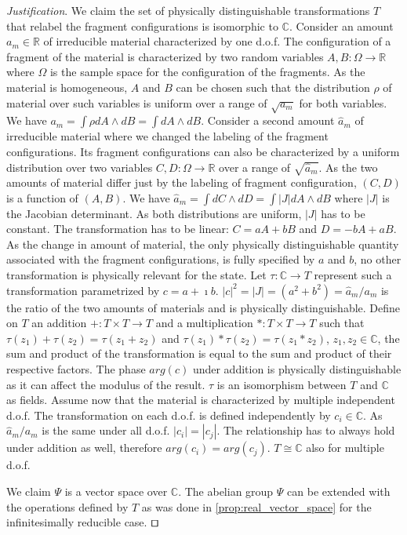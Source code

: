 \documentclass[smallextended]{svjour3}
\numberwithin{equation}{section}
\newenvironment{justification}{\emph{Justification}.}{\hfill\(\qed\)}
\theoremstyle{definition}
\newenvironment{justification}{\emph{Justification}.}{\qed}
\begin{document}
\begin{justification}
	We claim the set of physically distinguishable transformations $T$ that relabel the fragment configurations is isomorphic to $\mathbb{C}$. Consider an amount $a_m \in \mathbb{R}$ of irreducible material characterized by one d.o.f. The configuration of a fragment of the material is characterized by two random variables $A, B: \Omega \rightarrow \mathbb{R}$ where $\Omega$ is the sample space for the configuration of the fragments. As the material is homogeneous, $A$ and $B$ can be chosen such that the distribution $\rho$ of material over such variables is uniform over a range of $\sqrt{a_m}$ for both variables. We have $a_m=\int \rho dA \wedge dB = \int dA \wedge dB$. Consider a second amount $\hat{a}_m$ of irreducible material where we changed the labeling of the fragment configurations. Its fragment configurations can also be characterized by a uniform distribution over two variables $C, D: \Omega \rightarrow \mathbb{R}$ over a range of $\sqrt{\hat{a}_m}$. As the two amounts of material differ just by the labeling of fragment configuration, $(C,D)$ is a function of $(A,B)$. We have $\hat{a}_m = \int dC \wedge dD = \int |J| dA \wedge dB$ where $|J|$ is the Jacobian determinant. As both distributions are uniform, $|J|$ has to be constant. The transformation has to be linear: $C=aA + bB$ and $D=-bA + aB$. As the change in amount of material, the only physically distinguishable quantity associated with the fragment configurations, is fully specified by $a$ and $b$, no other transformation is physically relevant for the state. Let $\tau: \mathbb{C} \rightarrow T$ represent such a transformation parametrized by $c=a+\imath b$. $|c|^2 = |J| = (a^2 + b^2) = \hat{a}_m / a_m$ is the ratio of the two amounts of materials and is physically distinguishable. Define on $T$ an addition $+: T \times T \rightarrow T$ and a multiplication $*: T \times T \rightarrow T$ such that $\tau(z_1) + \tau(z_2) = \tau(z_1+z_2)$ and $\tau(z_1) * \tau(z_2) = \tau(z_1*z_2)$, $z_1,z_2 \in \mathbb{C}$, the sum and product of the transformation is equal to the sum and product of their respective factors. The phase $arg(c)$ under addition is physically distinguishable as it can affect the modulus of the result. $\tau$ is an isomorphism between $T$ and $\mathbb{C}$ as fields. Assume now that the material is characterized by multiple independent d.o.f. The transformation on each d.o.f. is defined independently by $c_i \in \mathbb{C}$. As $\hat{a}_m / a_m$ is the same under all d.o.f. $|c_i|=|c_j|$. The relationship has to always hold under addition as well, therefore $arg(c_i) = arg(c_j)$. $T\cong \mathbb{C}$ also for multiple d.o.f.

	We claim $\Psi$ is a vector space over $\mathbb{C}$. The abelian group $\Psi$ can be extended with the operations defined by $T$ as was done in \ref{prop:real_vector_space} for the infinitesimally reducible case.	
\end{justification}
\end{document}
